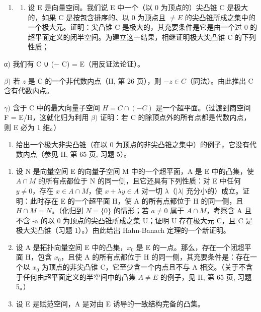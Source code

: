 \exercisegroup

\begin{enumerate}
\def\labelenumi{\arabic{enumi})}
\tightlist
\item
  \begin{enumerate}
  \def\labelenumii{\alph{enumii})}
  \tightlist
  \item
    设 E 是向量空间。我们说 E 中一个（以 0 为顶点的）尖凸锥 C 是极大的，如果 C 是按包含排序的、以 0 为顶点且 \(\neq E\) 的尖凸锥所成之集中的一个极大元。证明：尖凸锥 C 是极大的，其充要条件是它是由一个过 0 的超平面定义的闭半空间。为建立这一结果，相继证明极大尖凸锥 C 的下列性质；
  \end{enumerate}
\end{enumerate}

α) 我们有 C ∪ (− C) = E（用反证法论证）。

\(\beta)\) 若 \(z\) 是 C 的一个非代数内点（II, 第 26 页），则 \(-z \in C\)（同法）。由此推出 C 含有代数内点。

\(\gamma)\) 含于 C 中的最大向量子空间 \(H = C \cap (-C)\) 是一个超平面。（过渡到商空间 F = E/H，这就化归为利用 \(\beta)\) 证明：若 C 的除顶点外的所有点都是代数内点，则 E 必为 1 维。）

\begin{enumerate}
\def\labelenumi{\alph{enumi})}
\setcounter{enumi}{1}
\tightlist
\item
  给出一个极大非尖凸锥（在以 0 为顶点的非尖凸锥之集中）的例子，它没有代数内点（参见 II, 第 65 页, 习题 5）。
\end{enumerate}

\begin{enumerate}
\def\labelenumi{\arabic{enumi})}
\setcounter{enumi}{1}
\item
  设 N 是向量空间 E 的向量子空间 M 中的一个超平面，A 是 E 中的凸集，使 \(A \cap M\) 的所有点都位于 N 的同一侧，且它还具有下列性质：对 E 中任何 \(y \neq 0\)，存在 \(x \in A \cap M\)，使 \(x + \lambda y \in A\) 对一切 \(\lambda\)（\(|\lambda|\) 充分小的）成立。证明：此时存在 E 的一个超平面 H，使 A 的所有点都位于 H 的同一侧，且 \(H \cap M = N\)。（化归到 \(N = \{0\}\) 的情形；若 \(a \neq 0\) 属于 \(A \cap M\)，考察含 A 且不含 -a 的以 0 为顶点的尖凸锥所成之集 U；证明 U 存在极大元 C，且 C 是极大尖凸锥（习题 1）。）由此给出 Hahn-Banach 定理的一个新证明。
\item
  设 A 是拓扑向量空间 E 中的凸集，\(x_{0}\) 是 E 的一点。那么，存在一个闭超平面 H，包含 \(x_{0}\)，且使 A 的所有点都位于 H 的同一侧，其充要条件是：存在一个以 \(x_{0}\) 为顶点的非尖凸锥 C，它至少含一个内点且不与 A 相交。（关于不含于任何由超平面定义的半空间中的凸集 \(A \neq E\) 的例子，见 II, 第 65 页, 习题 5。）
\item
  设 E 是赋范空间，A 是对由 E 诱导的一致结构完备的凸集。
\end{enumerate}

